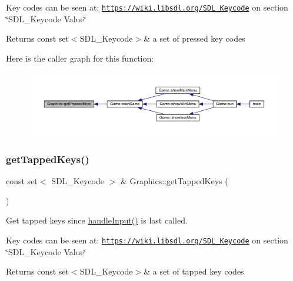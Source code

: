 Key codes can be seen at\+: \href{https://wiki.libsdl.org/SDL_Keycode}{\tt https\+://wiki.\+libsdl.\+org/\+S\+D\+L\+\_\+\+Keycode} on section \char`\"{}\+S\+D\+L\+\_\+\+Keycode Value\char`\"{} \begin{DoxyReturn}{Returns}
const set$<$\+S\+D\+L\+\_\+\+Keycode$>$\& a set of pressed key codes 
\end{DoxyReturn}
Here is the caller graph for this function\+:
\nopagebreak
\begin{figure}[H]
\begin{center}
\leavevmode
\includegraphics[width=350pt]{class_graphics_a772ed930cc5ae22dcdc35b4094bffbce_icgraph}
\end{center}
\end{figure}
\mbox{\label{class_graphics_a0444c93625b87614ed8a742d8833e5ad}} 
\subsubsection{\texorpdfstring{get\+Tapped\+Keys()}{getTappedKeys()}}
{\footnotesize\ttfamily const set$<$ S\+D\+L\+\_\+\+Keycode $>$ \& Graphics\+::get\+Tapped\+Keys (\begin{DoxyParamCaption}{ }\end{DoxyParamCaption})}



Get tapped keys since \mbox{\hyperlink{class_graphics_adff993cdcd0ed498c82cf7be87ead4f1}{handle\+Input()}} is last called. 

Key codes can be seen at\+: \href{https://wiki.libsdl.org/SDL_Keycode}{\tt https\+://wiki.\+libsdl.\+org/\+S\+D\+L\+\_\+\+Keycode} on section \char`\"{}\+S\+D\+L\+\_\+\+Keycode Value\char`\"{} \begin{DoxyReturn}{Returns}
const set$<$\+S\+D\+L\+\_\+\+Keycode$>$\& a set of tapped key codes 
\end{DoxyReturn}
\mbox{\label{class_graphics_adff993cdcd0ed498c82cf7be87ead4f1}} 
